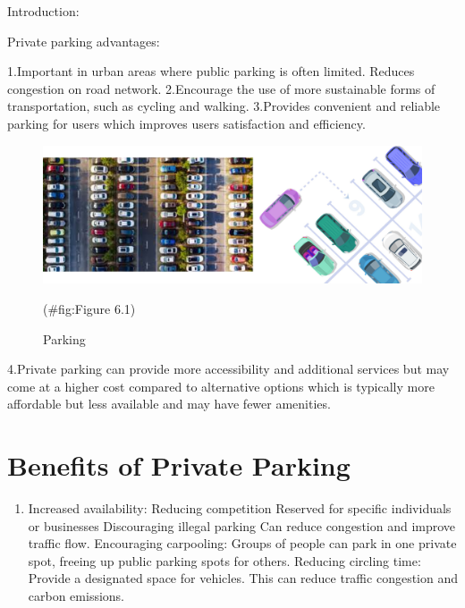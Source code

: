\documentclass[
]{book}
\providecommand{\tightlist}{%
  \setlength{\itemsep}{0pt}\setlength{\parskip}{0pt}}
\begin{document}
Introduction:

Private parking advantages:

1.Important in urban areas where public parking is often limited.
Reduces congestion on road network.
2.Encourage the use of more sustainable forms of transportation, such as cycling and walking.
3.Provides convenient and reliable parking for users which improves users satisfaction and efficiency.

\begin{figure}

{\centering \includegraphics{./Images/Parking/Parking} 

}

\caption{Parking}(\#fig:Figure 6.1)
\end{figure}

4.Private parking can provide more accessibility and additional services but may come at a higher cost compared to alternative options which is typically more affordable but less available and may have fewer amenities.

\hypertarget{parking-benefits}{%
\section{Benefits of Private Parking}\label{parking-benefits}}

\begin{enumerate}
\def\labelenumi{\arabic{enumi}.}
\tightlist
\item
  Increased availability:
  Reducing competition
  Reserved for specific individuals or businesses
  Discouraging illegal parking
  Can reduce congestion and improve traffic flow.
  Encouraging carpooling:
  Groups of people can park in one private spot, freeing up public parking spots for others.
  Reducing circling time:
  Provide a designated space for vehicles. This can reduce traffic congestion and carbon emissions.
\end{enumerate}
\end{document}
